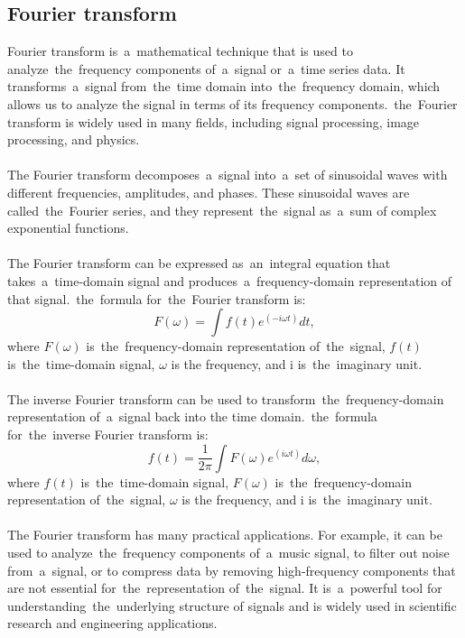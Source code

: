 \subsection{Fourier transform}\label{subsec:fourier}
Fourier transform is~a~mathematical technique that is used to analyze~the~frequency components of~a~signal or~a~time
series data. It transforms~a~signal from~the~time domain into~the~frequency domain, which allows us to analyze the
signal in terms of its frequency components.~the~Fourier transform is widely used in many fields, including signal
processing, image processing, and physics.\\
\\
The Fourier transform decomposes~a~signal into~a~set of sinusoidal waves with different frequencies, amplitudes, and phases.
These sinusoidal waves are called~the~Fourier series, and they represent~the~signal as~a~sum of complex exponential functions.\\
\\
The Fourier transform can be expressed as~an~integral equation that takes~a~time-domain signal and
produces~a~frequency-domain representation of that signal.~the~formula for~the~Fourier transform is:\\
\begin{equation}
    F(\omega) = \int f(t) e^{(-i \omega t)} dt,
\end{equation}
where $F(\omega)$ is~the~frequency-domain representation of~the~signal, $f(t)$ is~the~time-domain signal, $\omega$ is the
frequency, and i is~the~imaginary unit.\\
\\
The inverse Fourier transform can be used to transform~the~frequency-domain representation of~a~signal back into the
time domain.~the~formula for~the~inverse Fourier transform is:
\begin{equation}
    f(t) = \frac{1}{2\pi} \int F(\omega) e^{(i \omega t)} d\omega,
\end{equation}
where $f(t)$ is~the~time-domain signal, $F(\omega)$ is~the~frequency-domain representation of~the~signal, $\omega$ is the
frequency, and i is~the~imaginary unit.\\
\\
The Fourier transform has many practical applications. For example, it can be used to analyze~the~frequency components
of~a~music signal, to filter out noise from~a~signal, or to compress data by removing high-frequency components that
are not essential for~the~representation of~the~signal.  It is~a~powerful tool for understanding~the~underlying
structure of signals and is widely used in scientific research and engineering applications.

